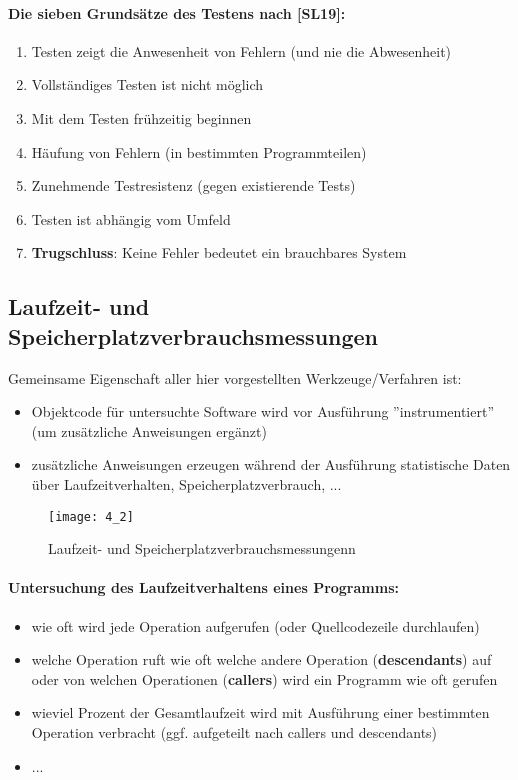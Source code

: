 \paragraph{Die sieben Grundsätze des Testens nach [SL19]:}
\begin{enumerate}
	\item Testen zeigt die Anwesenheit von Fehlern (und nie die Abwesenheit)
	\item Vollständiges Testen ist nicht möglich
	\item Mit dem Testen frühzeitig beginnen
	\item Häufung von Fehlern (in bestimmten Programmteilen)
	\item Zunehmende Testresistenz (gegen existierende Tests)
	\item Testen ist abhängig vom Umfeld
	\item \textbf{Trugschluss}: Keine Fehler bedeutet ein brauchbares System
\end{enumerate}

\subsection{Laufzeit- und Speicherplatzverbrauchsmessungen}
Gemeinsame Eigenschaft aller hier vorgestellten Werkzeuge/Verfahren ist:
\begin{itemize}
	\item Objektcode für untersuchte Software wird vor Ausführung ''instrumentiert'' (um zusätzliche Anweisungen ergänzt)
	\item zusätzliche Anweisungen erzeugen während der Ausführung statistische Daten über Laufzeitverhalten, Speicherplatzverbrauch, ...
\end{itemize}


\begin{figure}[h]
	\centering
	\caption{Laufzeit- und Speicherplatzverbrauchsmessungenn}
	\texttt{[image: 4\_2]}
\end{figure}

\paragraph{Untersuchung des Laufzeitverhaltens eines Programms:}
\begin{itemize}
	\item wie oft wird jede Operation aufgerufen (oder Quellcodezeile durchlaufen)
	\item welche Operation ruft wie oft welche andere Operation (\textbf{descendants}) auf oder von welchen Operationen (\textbf{callers}) wird ein Programm wie oft gerufen
	\item wieviel Prozent der Gesamtlaufzeit wird mit Ausführung einer bestimmten Operation verbracht (ggf. aufgeteilt nach callers und descendants)
	\item ...
\end{itemize}

